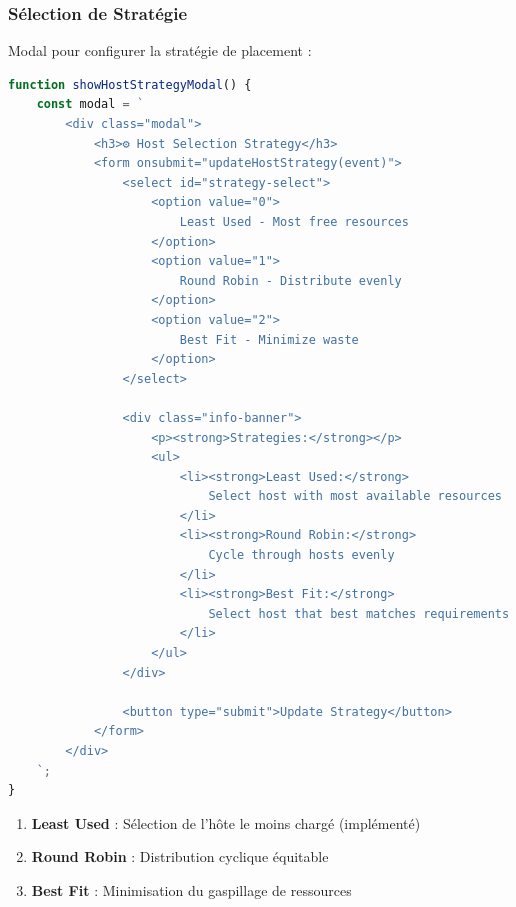 \documentclass[12pt,a4paper]{article}
\begin{document}
\subsubsection{Sélection de Stratégie}

Modal pour configurer la stratégie de placement :

\begin{lstlisting}[language=JavaScript,caption=Modal stratégie (hosts.js)]
function showHostStrategyModal() {
    const modal = `
        <div class="modal">
            <h3>⚙️ Host Selection Strategy</h3>
            <form onsubmit="updateHostStrategy(event)">
                <select id="strategy-select">
                    <option value="0">
                        Least Used - Most free resources
                    </option>
                    <option value="1">
                        Round Robin - Distribute evenly
                    </option>
                    <option value="2">
                        Best Fit - Minimize waste
                    </option>
                </select>
                
                <div class="info-banner">
                    <p><strong>Strategies:</strong></p>
                    <ul>
                        <li><strong>Least Used:</strong> 
                            Select host with most available resources
                        </li>
                        <li><strong>Round Robin:</strong> 
                            Cycle through hosts evenly
                        </li>
                        <li><strong>Best Fit:</strong> 
                            Select host that best matches requirements
                        </li>
                    </ul>
                </div>
                
                <button type="submit">Update Strategy</button>
            </form>
        </div>
    `;
}
\end{lstlisting}

\begin{successbox}
\begin{enumerate}
    \item \textbf{Least Used} : Sélection de l'hôte le moins chargé (implémenté)
    \item \textbf{Round Robin} : Distribution cyclique équitable
    \item \textbf{Best Fit} : Minimisation du gaspillage de ressources
\end{enumerate}
\end{successbox}
\end{document}
